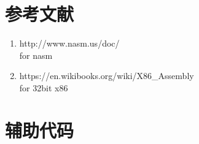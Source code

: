 \documentclass[a4paper]{article}
\begin{document}
\begin{appendices}
\section{参考文献} \label{sec:reference}
\begin{enumerate}
    \item http://www.nasm.us/doc/ \\
    for nasm
    \item https://en.wikibooks.org/wiki/X86\_Assembly \\
    for 32bit x86
  \end{enumerate}
    \section{辅助代码}\label{sec:utilitycode}
\end{appendices}
\end{document}
